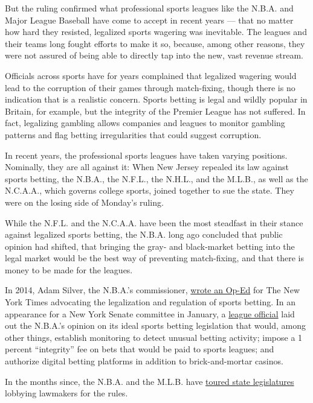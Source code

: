But the ruling confirmed what professional sports leagues like the
N.B.A. and Major League Baseball have come to accept in recent years ---
that no matter how hard they resisted, legalized sports wagering was
inevitable. The leagues and their teams long fought efforts to make it
so, because, among other reasons, they were not assured of being able to
directly tap into the new, vast revenue stream.

Officials across sports have for years complained that legalized
wagering would lead to the corruption of their games through
match-fixing, though there is no indication that is a realistic concern.
Sports betting is legal and wildly popular in Britain, for example, but
the integrity of the Premier League has not suffered. In fact,
legalizing gambling allows companies and leagues to monitor gambling
patterns and flag betting irregularities that could suggest corruption.

In recent years, the professional sports leagues have taken varying
positions. Nominally, they are all against it: When New Jersey repealed
its law against sports betting, the N.B.A., the N.F.L., the N.H.L., and
the M.L.B., as well as the N.C.A.A., which governs college sports,
joined together to sue the state. They were on the losing side of
Monday's ruling.

While the N.F.L. and the N.C.A.A. have been the most steadfast in their
stance against legalized sports betting, the N.B.A. long ago concluded
that public opinion had shifted, that bringing the gray- and
black-market betting into the legal market would be the best way of
preventing match-fixing, and that there is money to be made for the
leagues.

In 2014, Adam Silver, the N.B.A.'s commissioner,
\href{https://www.nytimes3xbfgragh.onion/2014/11/14/opinion/nba-commissioner-adam-silver-legalize-sports-betting.html}{wrote
an Op-Ed} for The New York Times advocating the legalization and
regulation of sports betting. In an appearance for a New York Senate
committee in January, a
\href{https://www.nysenate.gov/sites/default/files/1.24.18_testimony_of_national_basketball_association.pdf}{league
official} laid out the N.B.A.'s opinion on its ideal sports betting
legislation that would, among other things, establish monitoring to
detect unusual betting activity; impose a 1 percent ``integrity'' fee on
bets that would be paid to sports leagues; and authorize digital betting
platforms in addition to brick-and-mortar casinos.

In the months since, the N.B.A. and the M.L.B. have
\href{https://www.legalsportsreport.com/19395/sports-betting-lobby-funded-by-mlb-nba/}{toured
state legislatures} lobbying lawmakers for the rules.

